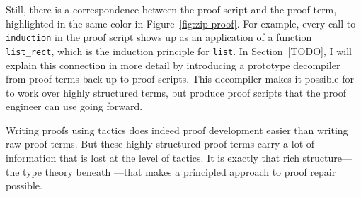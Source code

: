 Still, there is a correspondence between the proof script and the proof term, highlighted in the same color in Figure~\ref{fig:zip-proof}.
For example, every call to \lstinline{induction} in the proof script shows up as an application of a function \lstinline{list_rect},
which is the induction principle for \lstinline{list}.
In Section~\ref{TODO}, I will explain this connection in more detail by introducing a prototype decompiler from proof terms back up to proof scripts.
This decompiler makes it possible for \sysname to work over highly structured  terms,
but produce proof scripts that the proof engineer can use going forward.

Writing proofs using tactics does indeed proof development easier than writing raw proof terms.
But these highly structured proof terms carry a lot of information that is lost at the level of tactics.
It is exactly that rich structure---the type theory beneath ---that makes a principled approach to proof repair possible.






